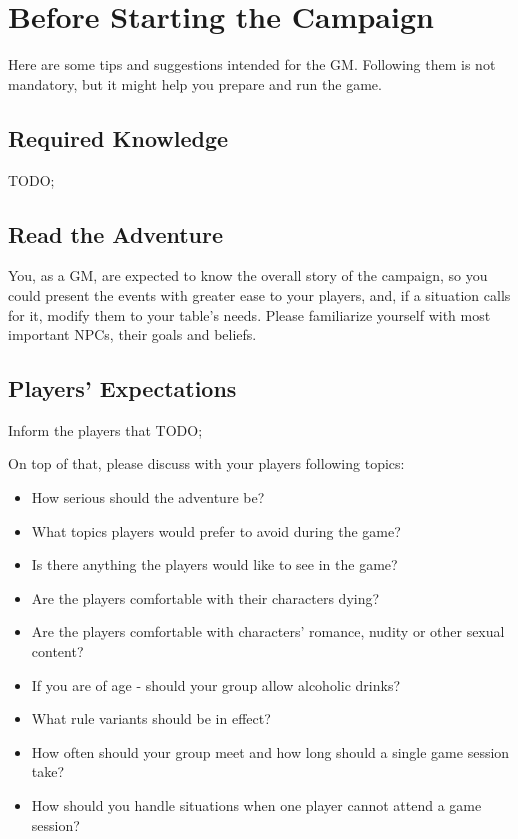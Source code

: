 \section{Before Starting the Campaign}

Here are some tips and suggestions intended for the GM. Following them is not mandatory, but it might help you prepare and run the game.

\subsection{Required Knowledge}

TODO; \lipsum[1][1-5]

\subsection{Read the Adventure}

You, as a GM, are expected to know the overall story of the campaign, so you could present the events with greater ease to your players, and, if a situation calls for it, modify them to your table's needs. Please familiarize yourself with most important NPCs, their goals and beliefs.

\subsection{Players’ Expectations}
\label{ssec:playersExpectations}

Inform the players that TODO; \lipsum[1][1-5]

On top of that, please discuss with your players following topics:
\begin{itemize}
	\item How serious should the adventure be?
	\item What topics players would prefer to avoid during the game?
	\item Is there anything the players would like to see in the game?
	\item Are the players comfortable with their characters dying?
	\item Are the players comfortable with characters’ romance, nudity or other sexual content?
	\item If you are of age - should your group allow alcoholic drinks?
	\item What rule variants should be in effect?
	\item How often should your group meet and how long should a single game session take?
	\item How should you handle situations when one player cannot attend a game session?
\end{itemize}

